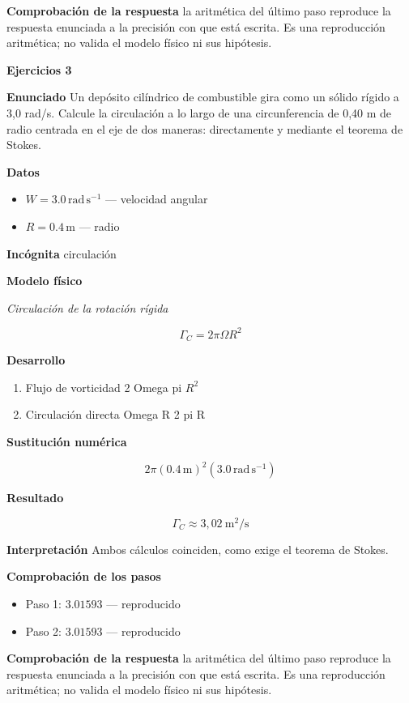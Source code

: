 \documentclass[10pt,openany]{book}
\begin{document}
\noindent\textbf{Comprobación de la respuesta} la aritmética del último paso reproduce la respuesta enunciada a la precisión con que está escrita. Es una reproducción aritmética; no valida el modelo físico ni sus hipótesis.

\noindent\textbf{Ejercicios 3}

\noindent\textbf{Enunciado}
Un depósito cilíndrico de combustible gira como un sólido rígido a 3,0 rad/s. Calcule la circulación a lo largo de una circunferencia de 0,40 m de radio centrada en el eje de dos maneras: directamente y mediante el teorema de Stokes.

\noindent\textbf{Datos}
\begin{itemize}
\item $W = 3.0\,\mathrm{rad}\,\mathrm{s}^{-1}$ — velocidad angular
\item $R = 0.4\,\mathrm{m}$ — radio
\end{itemize}

\noindent\textbf{Incógnita}
circulación

\noindent\textbf{Modelo físico}

\noindent\textit{Circulación de la rotación rígida}

\[
\Gamma_C = 2\pi\Omega R^{2}
\]

\noindent\textbf{Desarrollo}
\begin{enumerate}
\item
Flujo de vorticidad 2 Omega pi \(R^2\)
\item
Circulación directa Omega R 2 pi R
\end{enumerate}

\noindent\textbf{Sustitución numérica}

\[
2 \pi \left(0.4\,\mathrm{m}\right)^{2} \left(3.0\,\mathrm{rad}\,\mathrm{s}^{-1}\right)
\]

\noindent\textbf{Resultado}

\[
\Gamma_C \approx 3{,}02\ \mathrm{m^{2}/s}
\]

\noindent\textbf{Interpretación}
Ambos cálculos coinciden, como exige el teorema de Stokes.

\noindent\textbf{Comprobación de los pasos}
\begin{itemize}
\item Paso 1: $3.01593$ — reproducido
\item Paso 2: $3.01593$ — reproducido
\end{itemize}

\noindent\textbf{Comprobación de la respuesta} la aritmética del último paso reproduce la respuesta enunciada a la precisión con que está escrita. Es una reproducción aritmética; no valida el modelo físico ni sus hipótesis.
\end{document}
